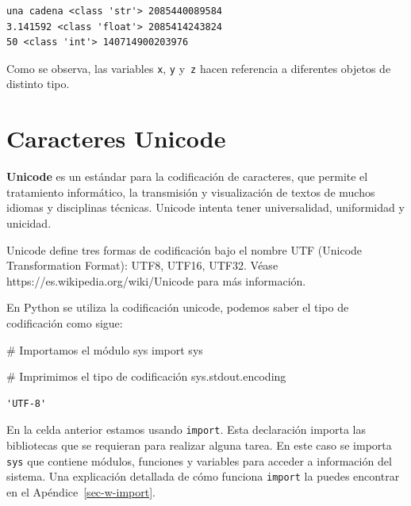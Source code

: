 \documentclass[
  spanish,
  letterpaper,
]{scrbook}
\newenvironment{Shaded}{\begin{snugshade}}{\end{snugshade}}
\newcommand{\CommentTok}[1]{\textcolor[rgb]{0.37,0.37,0.37}{#1}}
\newcommand{\ImportTok}[1]{\textcolor[rgb]{0.00,0.46,0.62}{#1}}
\newcommand{\NormalTok}[1]{\textcolor[rgb]{0.00,0.23,0.31}{#1}}
\theoremstyle{definition}
\theoremstyle{remark}
\begin{document}
\begin{verbatim}
una cadena <class 'str'> 2085440089584
3.141592 <class 'float'> 2085414243824
50 <class 'int'> 140714900203976
\end{verbatim}

Como se observa, las variables \texttt{x}, \texttt{y} y~\texttt{z} hacen
referencia a diferentes objetos de distinto tipo.

\section{Caracteres Unicode}\label{sec-a-unicode}

\textbf{Unicode} es un estándar para la codificación de caracteres, que
permite el tratamiento informático, la transmisión y visualización de
textos de muchos idiomas y disciplinas técnicas. Unicode intenta tener
universalidad, uniformidad y unicidad.

Unicode define tres formas de codificación bajo el nombre UTF (Unicode
Transformation Format): UTF8, UTF16, UTF32. Véase
https://es.wikipedia.org/wiki/Unicode para más información.

En Python se utiliza la codificación unicode, podemos saber el tipo de
codificación como sigue:

\begin{Shaded}
\begin{Highlighting}[]
\CommentTok{\# Importamos el módulo sys}
\ImportTok{import}\NormalTok{ sys}

\CommentTok{\# Imprimimos el tipo de codificación}
\NormalTok{sys.stdout.encoding }
\end{Highlighting}
\end{Shaded}

\begin{verbatim}
'UTF-8'
\end{verbatim}

\begin{tcolorbox}[enhanced jigsaw, colframe=quarto-callout-note-color-frame, opacityback=0, toprule=.15mm, colback=white, coltitle=black, leftrule=.75mm, arc=.35mm, breakable, left=2mm, bottomtitle=1mm, rightrule=.15mm, bottomrule=.15mm, colbacktitle=quarto-callout-note-color!10!white, toptitle=1mm, titlerule=0mm, opacitybacktitle=0.6, title=\textcolor{quarto-callout-note-color}{\faInfo}\hspace{0.5em}{Nota.}]

En la celda anterior estamos usando \texttt{import}. Esta declaración
importa las bibliotecas que se requieran para realizar alguna tarea. En
este caso se importa \texttt{sys} que contiene módulos, funciones y
variables para acceder a información del sistema. Una explicación
detallada de cómo funciona \texttt{import} la puedes encontrar en el
Apéndice~\ref{sec-w-import}.

\end{tcolorbox}
\end{document}
